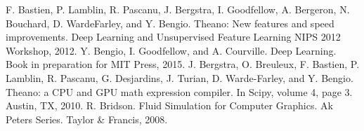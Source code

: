 \documentclass{kcc}
\begin{document}

\begin{thebibliography}{7}
\newblock F. Bastien, P. Lamblin, R. Pascanu, J. Bergstra, I. Goodfellow, A. Bergeron, N. Bouchard, D. WardeFarley,
and Y. Bengio. Theano: New features and speed improvements. Deep Learning and Unsupervised
Feature Learning NIPS 2012 Workshop, 2012.
\newblock Y. Bengio, I. Goodfellow, and A. Courville. Deep Learning. Book in preparation for MIT Press, 2015.
\newblock J. Bergstra, O. Breuleux, F. Bastien, P. Lamblin, R. Pascanu, G. Desjardins, J. Turian, D. Warde-Farley,
and Y. Bengio. Theano: a CPU and GPU math expression compiler. In Scipy, volume 4, page 3. Austin,
TX, 2010.
\newblock R. Bridson. Fluid Simulation for Computer Graphics. Ak Peters Series. Taylor \& Francis, 2008.

\end{thebibliography}

%
%
\end{document}
